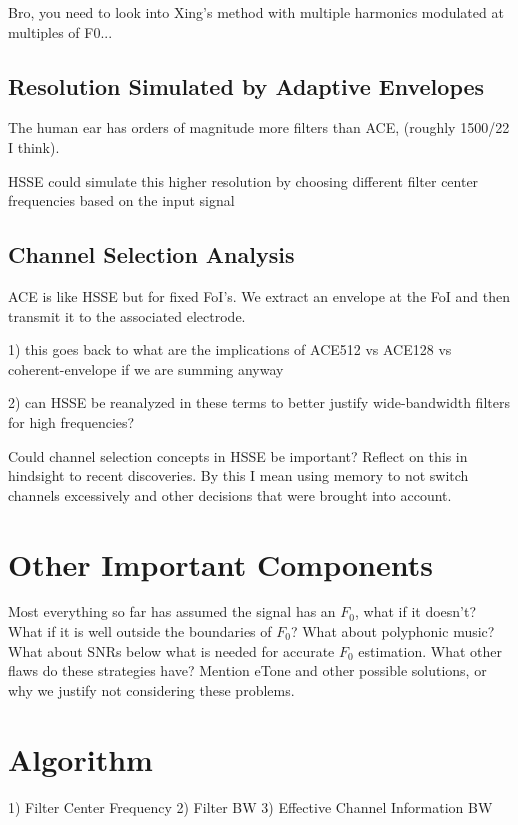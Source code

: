 \documentclass [11pt, proquest] {uwthesis}[2015/03/03]
\begin{document}
Bro, you need to look into Xing's method with multiple harmonics modulated at multiples of F0...


\subsection{Resolution Simulated by Adaptive Envelopes}

The human ear has orders of magnitude more filters than ACE, (roughly 1500/22 I think).

HSSE could simulate this higher resolution by choosing different filter center frequencies based on the input signal

\subsection{Channel Selection Analysis}

ACE is like HSSE but for fixed FoI's.  We extract an envelope at the FoI and then transmit it to the associated electrode.

1) this goes back to what are the implications of ACE512 vs ACE128 vs coherent-envelope if we are summing anyway

2) can HSSE be reanalyzed in these terms to better justify wide-bandwidth filters for high frequencies?

Could channel selection concepts in HSSE be important?  Reflect on this in hindsight to recent discoveries.  By this I mean using memory to not switch channels excessively and other decisions that were brought into account.

\section{Other Important Components}

Most everything so far has assumed the signal has an $F_0$, what if it doesn't?  What if it is well outside the boundaries of $F_0$?  What about polyphonic music?  What about SNRs below what is needed for accurate $F_0$ estimation.  What other flaws do these strategies have?  Mention eTone and other possible solutions, or why we justify not considering these problems.

\section{Algorithm}

1) Filter Center Frequency
2) Filter BW
3) Effective Channel Information BW
\end{document}
